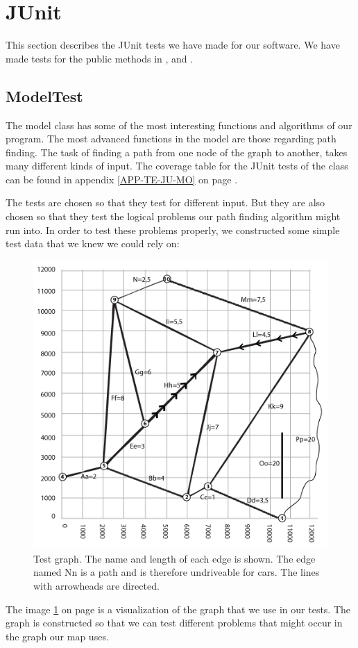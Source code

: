\section{JUnit}
\label{TEST-JU}
This section describes the JUnit tests we have made for our software. We have
made tests for the public methods in ,  and
.

\subsection{ModelTest}
\label{TEST-JU-MT}
The model class has some of the most interesting functions and algorithms of
our program. The most advanced functions in the model are those regarding path
finding. The task of finding a path from one node of the graph to another,
takes many different kinds of input. The coverage table for the JUnit tests of
the  class can be found in appendix \ref{APP-TE-JU-MO} on page
\pageref{APP-TE-JU-MO}.

The tests are chosen so that they test for different input. But they are also
chosen so that they test the logical problems our path finding algorithm might
run into. In order to test these problems properly, we constructed some simple
test data that we knew we could rely on:

\begin{figure}[!ht]
\centering
\includegraphics[width=0.6\linewidth]{images/TestGraph}
\caption{Test graph. The name and length of each edge is shown. The edge named
Nn is a path and is therefore undriveable for cars. The lines with arrowheads
are directed.}
\label{TEST-JU-MT-TG}
\end{figure}

The image \ref{TEST-JU-MT-TG} on page \pageref{TEST-JU-MT-TG} is a visualization
of the graph that we use in our tests. The graph is constructed so that we can
test different problems that might occur in the graph our map uses.

